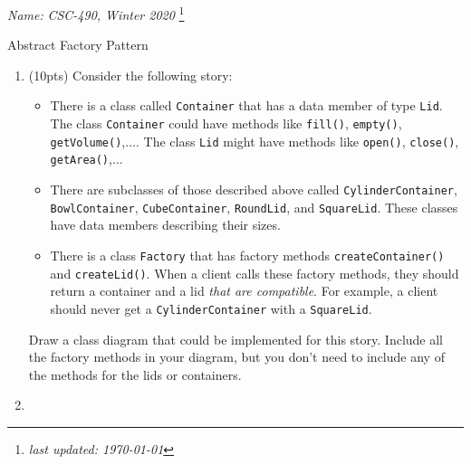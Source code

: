 \documentclass[11pt]{article}
\newlength{\up}\setlength{\up}{-\baselineskip}
\newcommand\blfootnote[1]{%
  \begingroup
  \renewcommand\thefootnote{}\footnote{#1}%
  \addtocounter{footnote}{-1}%
  \endgroup
}
\begin{document}
\noindent\emph{Name:}
\hfill
\emph{CSC-490, Winter 2020}
\blfootnote{\emph{last updated: \today}}

\vspace{-0.4in}

\begin{center}
  {\huge Abstract Factory Pattern}
\end{center}

\medskip




\begin{enumerate}

  \item (10pts) Consider the following story:

  \begin{itemize}

    \item There is a class called \texttt{Container} that has a data member of type \texttt{Lid}. The class \texttt{Container} could have methods like \texttt{fill()}, \texttt{empty()}, \texttt{getVolume()},$\ldots$. The class \texttt{Lid} might have methods like \texttt{open()}, \texttt{close()}, \texttt{getArea()},$\ldots$

    \item There are subclasses of those described above called \texttt{CylinderContainer}, \texttt{BowlContainer}, \texttt{CubeContainer}, \texttt{RoundLid}, and \texttt{SquareLid}. These classes have data members describing their sizes.

    \item There is a class \texttt{Factory} that has factory methods \texttt{createContainer()} and \texttt{createLid()}. When a client calls these factory methods, they should return a container and a lid \emph{that are compatible}. For example, a client should never get a \texttt{CylinderContainer} with a \texttt{SquareLid}.

  \end{itemize}

  Draw a class diagram that could be implemented for this story. Include all the factory methods in your diagram, but you don't need to include any of the methods for the lids or containers.

\newpage

  \item 
  \begin{enumerate}


\end{enumerate}
\end{enumerate}
\end{document}
